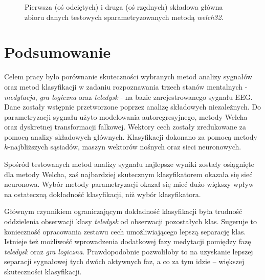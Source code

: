 \documentclass[notitlepage]{report}
\begin{document}
\begin{figure}[H]
	\centering
	\caption{Pierwsza (oś odciętych) i druga (oś rzędnych) składowa główna zbioru danych testowych sparametryzowanych metodą \textit{welch32}.}
\end{figure}

\chapter*{Podsumowanie}
 
Celem pracy było porównanie skuteczności wybranych metod analizy sygnałów oraz metod klasyfikacji w zadaniu rozpoznawania trzech stanów mentalnych - \textit{medytacja}, \textit{gra logiczna} oraz \textit{teledysk} - na bazie zarejestrowanego sygnału EEG. Dane zostały wstępnie przetworzone poprzez analizę składowych niezależnych. Do parametryzacji sygnału użyto modelowania autoregresyjnego, metody Welcha oraz dyskretnej transformacji falkowej. Wektory cech zostały zredukowane za pomocą analizy składowych głównych. Klasyfikacji dokonano za pomocą metody $k$-najbliższych sąsiadów, maszyn wektorów nośnych oraz sieci neuronowych. 

Spośród testowanych metod analizy sygnału najlepsze wyniki zostały osiągnięte dla metody Welcha, zaś najbardziej skutecznym klasyfikatorem okazała się sieć neuronowa. Wybór metody parametryzacji okazał się mieć dużo większy wpływ na ostateczną dokładność klasyfikacji, niż wybór klasyfikatora. 

Głównym czynnikiem ograniczającym dokładność klasyfikacji była trudność oddzielenia obserwacji klasy \textit{teledysk} od obserwacji pozostałych klas. Sugeruje to konieczność opracowania zestawu cech umożliwiającego lepszą separację klas. Istnieje też możliwość wprowadzenia dodatkowej fazy medytacji pomiędzy fazę \textit{teledysk} oraz \textit{gra logiczna}. Prawdopodobnie pozwoliłoby to na uzyskanie lepszej separacji sygnałowej tych dwóch aktywnych faz, a co za tym idzie – większej skuteczności klasyfikacji.
\end{document}
